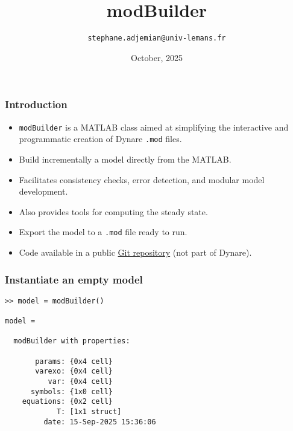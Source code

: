 \documentclass[10pt,slidestop]{beamer}
\theoremstyle{plain}
\begin{document}
\title{modBuilder}
\author[]{\texttt{stephane.adjemian@univ-lemans.fr}}
\date{October,  2025}

\begin{frame}
  \titlepage{}
\end{frame}

\begin{frame}[fragile]
  \frametitle{Introduction}

  \bigskip

  \begin{itemize}

  \item \verb+modBuilder+ is a MATLAB class aimed at simplifying the interactive and
    programmatic creation of Dynare \verb+.mod+ files.\newline

  \item Build incrementally a model directly from the MATLAB.\newline

  \item Facilitates consistency checks, error detection, and modular
    model development.\newline

  \item Also provides tools for computing the steady state.\newline

  \item Export the model to a \verb+.mod+ file ready to run.\newline

  \item Code available in a public \href{https://git.dynare.org/stepan-a/modbuilder}{Git repository} (not part of Dynare).

  \end{itemize}

\end{frame}


\begin{frame}[fragile]
  \frametitle{Instantiate an empty model}

\begin{lstlisting}[style=MatlabConsole]
>> model = modBuilder()

model =

  modBuilder with properties:

       params: {0x4 cell}
       varexo: {0x4 cell}
          var: {0x4 cell}
      symbols: {1x0 cell}
    equations: {0x2 cell}
            T: [1x1 struct]
         date: 15-Sep-2025 15:36:06
   \end{lstlisting}

\end{frame}
\end{document}
